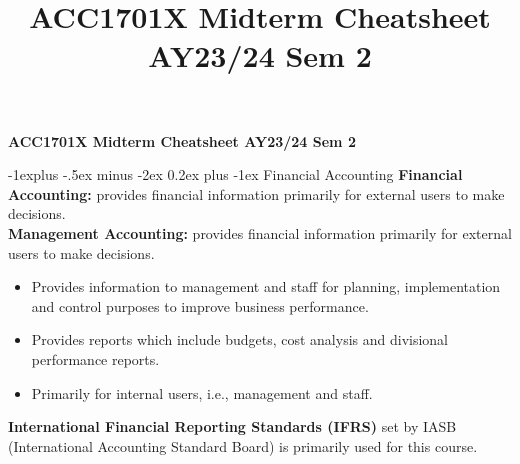 \documentclass[10pt,landscape]{article}
\title{ACC1701X Midterm Cheatsheet AY23/24 Sem 2}
\makeatletter
\renewcommand{\subsection}{\@startsection{subsection}{2}{0mm}%
                                {-1explus -.5ex minus -2ex}%
                                {0.2ex plus -1ex}%
                                {\normalfont\small\bfseries}}
\makeatother
\begin{document}
\raggedright
\footnotesize

\begin{center}
     \Large{\textbf{ACC1701X Midterm Cheatsheet AY23/24 Sem 2}} \\
\end{center}
\begin{multicols}{3}
\setlength{\premulticols}{1pt}
\setlength{\postmulticols}{1pt}
\setlength{\multicolsep}{1pt}
\setlength{\columnsep}{2pt}
\begin{scriptsize}

\subsection{Financial Accounting}
\textbf{Financial Accounting:} provides financial information primarily for external users to make decisions.\\
\textbf{Management Accounting:} provides financial information primarily for external users to make decisions.
\begin{itemize} \itemsep -2pt
    \item Provides information to management and staff for planning, implementation and control purposes to improve business performance.
    \item Provides reports which include budgets, cost analysis and 
    divisional performance reports.
    \item Primarily for internal users, i.e., management and staff.
\end{itemize}
\textbf{International Financial Reporting Standards (IFRS)} set by IASB (International Accounting Standard Board) is primarily used for this course.


\end{scriptsize}
\end{multicols}
\end{document}
